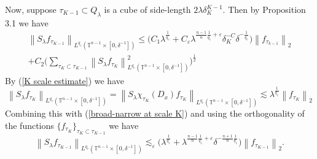 \documentclass[11pt]{amsart}
\numberwithin{equation}{section}
\newcommand{\Tn}{\mathbb{T}^{n-1}}
\newcommand{\la}{\lambda}
\newcommand\norm[1]{\left\lVert#1\right\rVert}
\newcommand{\lpnorm}[3]{\norm{#1}_{L^{#2}(#3)}}
\newcommand{\altlpnorm}[2]{\norm{#1}_{#2}}
\newcommand{\Sl}{S_{\la}}
\newcommand{\dK}[1]{\delta_{K}^{#1}}
\begin{document}
Now, suppose $\tau_{K-1} \subset Q_{\la}$ is a cube of side-length $2\la \dK{K-1}$. Then by Proposition 3.1 we have
\begin{equation} \label{broad-narrow at scale K}
\begin{split}
    \lpnorm{\Sl f_{\tau_{K-1}}}{q_c}{\Tn\times[0, \delta^{-1}]} \leq \big(C_1 \la^{\frac{1}{q_c}} + C_{\varepsilon}\la^{\frac{n-1}{n}\frac{1}{q_c} + \varepsilon}\dK{-C}\delta^{-\frac{1}{q_c}}\big)\altlpnorm{f_{\tau_{k-1}}}{2} \\
    + C_2\Big(\sum_{\tau_{K} \subset \tau_{K-1}}\lpnorm{\Sl f_{\tau_{K}}}{q_c}{\Tn \times [0, \delta^{-1}]}^{2}\Big)^{\frac{1}{2}}
\end{split}
\end{equation}
\noindent
By (\ref{K scale estimate}) we have
\begin{equation}\label{smallest scale Strichartz}
    \lpnorm{\Sl f_{\tau_{K}}}{q_c}{\Tn \times [0, \delta^{-1}]} = \lpnorm{\Sl \chi_{\tau_{K}}(D_x)f_{\tau_{K}}}{q_c}{\Tn \times [0, \delta^{-1}]}   \lesssim \la^{\frac{1}{q_c}}\altlpnorm{f_{\tau_{K}}}{2}
\end{equation}
Combining this with (\ref{broad-narrow at scale K}) and using the orthogonality of the functions $\{ f_{\tau_{K}}\}_{\tau_K \subset \tau_{K-1}}$ we have
\begin{equation}
    \lpnorm{\Sl f_{\tau_{K-1}}}{q_c}{\Tn\times[0, \delta^{-1}]} \lesssim_{\varepsilon}\big( \la^{\frac{1}{q_c}} + \la^{\frac{n-1}{n}\frac{1}{q_c} + \varepsilon}\delta^{-\frac{n+1}{n}\frac{1}{q_c}}\big)\altlpnorm{f_{\tau_{K-1}}}{2}.
\end{equation}
\end{document}
